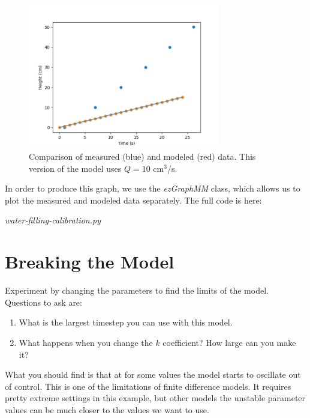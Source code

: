 \documentclass[11pt,fleqn]{book}
\begin{document}
	\begin{figure}[h!]
		\begin{center}
		\includegraphics[width=0.75\textwidth]{filling-calibration-Q=10.png}
		\caption{Comparison of measured (blue) and modeled (red) data. This version of the model uses $Q=10$ cm$^3$/s.}
		\end{center}
	\end{figure}
	
	In order to produce this graph, we use the \textit{ezGraphMM} class, which allows us to plot the measured and modeled data separately. The full code is here:
	
	\textit{water-filling-calibration.py}
	
	
	
	
	\section{Breaking the Model}
		Experiment by changing the parameters to find the limits of the model. Questions to ask are:
		
		\begin{enumerate}
			\item What is the largest timestep you can use with this model.
			\item What happens when you change the $k$ coefficient? How large can you make it?
		\end{enumerate}
	
		What you should find is that at for some values the model starts to oscillate out of control. This is one of the limitations of finite difference models. It requires pretty extreme settings in this example, but other models the unstable parameter values can be much closer to the values we want to use.
	
\end{document}
